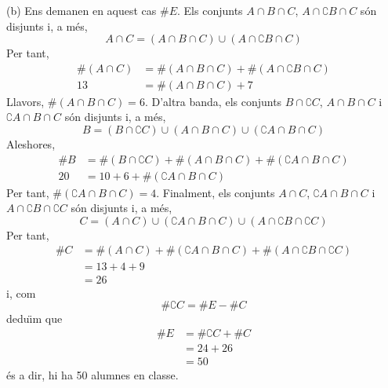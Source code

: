 \begin{solucio}
(b) Ens demanen en aquest cas $\#E$. Els conjunts $A\cap B\cap C$, $A\cap
\complement B\cap C$ s\'{o}n disjunts i, a m\'{e}s,%
\begin{equation*}
A\cap C=\left( A\cap B\cap C\right) \cup \left( A\cap \complement B\cap
C\right)
\end{equation*}%
Per tant,%
\begin{align*}
\#\left( A\cap C\right) & =\#\left( A\cap B\cap C\right) +\#\left( A\cap
\complement B\cap C\right) \\
13& =\#\left( A\cap B\cap C\right) +7
\end{align*}%
Llavors, $\#\left( A\cap B\cap C\right) =6$. D'altra banda, els conjunts $%
B\cap \complement C$, $A\cap B\cap C$ i $\complement A\cap B\cap C$ s\'{o}n
disjunts i, a m\'{e}s,%
\begin{equation*}
B=\left( B\cap \complement C\right) \cup \left( A\cap B\cap C\right) \cup
\left( \complement A\cap B\cap C\right)
\end{equation*}%
Aleshores,%
\begin{align*}
\#B& =\#\left( B\cap \complement C\right) +\#\left( A\cap B\cap C\right)
+\#\left( \complement A\cap B\cap C\right) \\
20& =10+6+\#\left( \complement A\cap B\cap C\right)
\end{align*}%
Per tant, $\#\left( \complement A\cap B\cap C\right) =4$. Finalment, els
conjunts $A\cap C$, $\complement A\cap B\cap C$ i $A\cap \complement B\cap
\complement C$ s\'{o}n disjunts i, a m\'{e}s,%
\begin{equation*}
C=\left( A\cap C\right) \cup \left( \complement A\cap B\cap C\right) \cup
\left( A\cap \complement B\cap \complement C\right)
\end{equation*}%
Per tant,%
\begin{align*}
\#C& =\#\left( A\cap C\right) +\#\left( \complement A\cap B\cap C\right)
+\#\left( A\cap \complement B\cap \complement C\right) \\
& =13+4+9 \\
& =26
\end{align*}%
i, com%
\begin{equation*}
\#\complement C=\#E-\#C
\end{equation*}%
dedu\"{\i}m que%
\begin{align*}
\#E& =\#\complement C+\#C \\
& =24+26 \\
& =50
\end{align*}%
\'{e}s a dir, hi ha 50 alumnes en classe.
\end{solucio}

